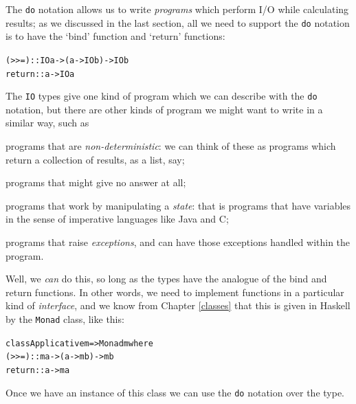 The \texttt{do} notation allows us to write \emph{programs} which perform I/O while calculating results; as we discussed in the last section, all we need to support the \texttt{do} notation is to have the `bind' function and `return' functions:
\begin{alltt}
(>>=) :: IO a -> (a -> IO b) -> IO b
return :: a -> IO a
\end{alltt} 
The \texttt{IO} types give one kind of program which we can describe with the \texttt{do} notation, but there are other kinds of program we might want to write in a similar way, such as
\begin{titemize}
\item
programs that are \emph{non-deterministic}: we can think of these as programs which return a collection of results, as a list, say;
\item
programs that might give no answer at all;
\item
programs that work by manipulating a \emph{state}: that is programs that have variables in the sense of imperative languages like Java and C;
\item
programs that raise \emph{exceptions}, and can have those exceptions handled within the program.
\end{titemize}
Well, we \emph{can} do this, so long as the types have the analogue of the bind and return functions. In other words, we need to implement functions in a particular kind of \emph{interface}, and we know from Chapter \ref{classes} that this is given in Haskell by the \texttt{Monad} class, like this:
\begin{alltt}
class Applicative m => Monad m where
  (>>=)  :: m a -> (a -> m b) -> m b
  return :: a -> m a
\end{alltt}
Once we have an instance of this class we can use the \texttt{do} notation over the type. 


